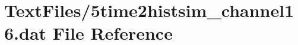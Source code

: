 \hypertarget{5time2histsim__channel16_8dat}{}\section{Text\+Files/5time2histsim\+\_\+channel16.dat File Reference}
\label{5time2histsim__channel16_8dat}
